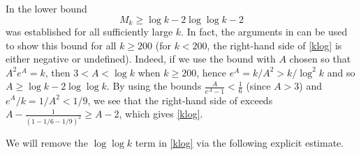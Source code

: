\documentclass{bmcart}
\theoremstyle{plain}
\theoremstyle{definition}
\begin{document}
In \cite{maynard-new} the lower bound
\begin{equation}\label{klog}
 M_k \geq \log k - 2\log\log k - 2
\end{equation}
was established for all sufficiently large $k$.  In fact, the arguments in \cite{maynard-new} can be used to show this bound for all $k \geq 200$ (for $k<200$, the right-hand side of \eqref{klog} is either negative or undefined).  Indeed, if we use the bound \cite[(7.19)]{maynard-new} with $A$ chosen so that $A^2 e^A = k$, then $3 < A < \log k$ when $k \geq 200$, hence $e^A = k/A^2 > k / \log^2 k$ and so $A \geq \log k - 2 \log\log k$.  By using the bounds $\frac{A}{e^A-1} < \frac{1}{6}$ (since $A >3$) and $e^A/k = 1/A^2 < 1/9$, we see that the right-hand side of \cite[(8.17)]{maynard-new} exceeds $A - \frac{1}{(1-1/6 - 1/9)^2} \geq A-2$, which gives \eqref{klog}.

We will remove the $\log\log k$ term in \eqref{klog} via the following explicit estimate.
\end{document}
